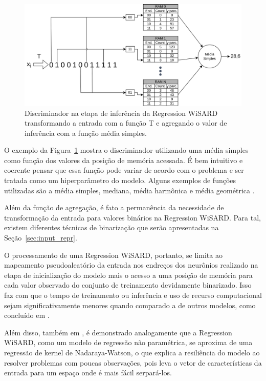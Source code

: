 \begin{figure}[!ht]
    \centering
    \includegraphics[width=5.0in]{img/rew_regression.pdf}
    \caption{Discriminador na etapa de inferência da Regression WiSARD transformando a entrada com a função T e agregando o valor de inferência com a função média simples.}
    \label{fig:rew_discr}
\end{figure}

O exemplo da Figura~\ref{fig:rew_discr} mostra o discriminador utilizando uma média simples como função dos valores da posição de memória acessada. É bem intuitivo e coerente pensar que essa função pode variar de acordo com o problema e ser tratada como um hiperparâmetro do modelo. Alguns exemplos de funções utilizadas são a média simples, mediana, média harmônica e média geométrica \cite{rew}.

Além da função de agregação, é fato a permanência da necessidade de transformação da entrada para valores binários na Regression WiSARD. Para tal, existem diferentes técnicas de binarização que serão apresentadas na Seção~\ref{sec:input_repr}.

O processamento de uma Regression WiSARD, portanto, se limita ao mapeamento pseudoaleatório da entrada nos endreços dos neurônios realizado na etapa de inicialização do modelo mais o acesso a uma posição de memória para cada valor observado do conjunto de treinamento devidamente binarizado. Isso faz com que o tempo de treinamento ou inferência e uso de recurso computacional sejam significativamente menores quando comparado a de outros modelos, como concluído em \cite{KOLCZ1996855}.

Além disso, também em \cite{KOLCZ1996855}, é demonstrado analogamente que a Regression WiSARD, como um modelo de regressão não paramétrica, se aproxima de uma regressão de kernel de Nadaraya-Watson, o que explica a resiliência do modelo ao resolver problemas com poucas observações, pois leva o vetor de características da entrada para um espaço onde é mais fácil serpará-los.

